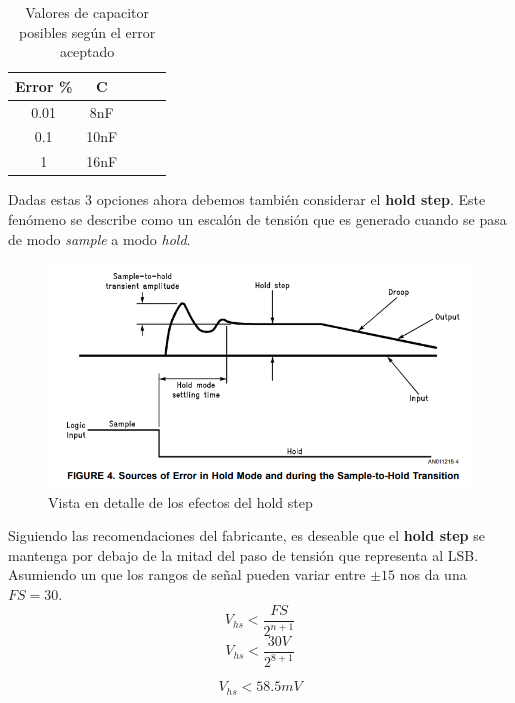 \begin{table}[H]
	\centering
	\begin{tabular}{@{}ccccc@{}}
		\toprule
		\multicolumn{1}{c}{\textbf{Error \%}} & \multicolumn{1}{c}{\textbf{C}} &  &  &  \\ \midrule
		0.01                                  & 8nF                            &  &  &  \\
		0.1                                   & 10nF                           &  &  &  \\
		1                                     & 16nF                           &  &  &  \\ \bottomrule
	\end{tabular}
	\caption{Valores de capacitor posibles según el error aceptado}
	\label{tab:acqCap}
\end{table}
	
Dadas estas 3 opciones ahora debemos también considerar el \textbf{hold step}. Este fenómeno se describe como un escalón de tensión que es generado cuando se pasa de modo \textit{sample} a modo \textit{hold}.
\begin{figure}[H]
	\centering
	\includegraphics[scale=0.6]{ImagenesEjercicio4/HoldStepError}
	\caption{Vista en detalle de los efectos del hold step}
	\label{fig:holdsteperror}
\end{figure}

Siguiendo las recomendaciones del fabricante, es deseable que el \textbf{hold step} se mantenga por debajo de la mitad del paso de tensión que representa al LSB. Asumiendo un que los rangos de señal pueden variar entre $\pm15$ nos da una $FS=30$.
$$V_{hs}<\frac{FS}{2^{n+1}}$$
$$V_{hs}<\frac{30V}{2^{8+1}}$$

$$V_{hs}< 58.5mV$$

